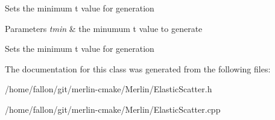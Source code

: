 Sets the minimum t value for generation 
\begin{DoxyParams}{Parameters}
{\em tmin} & the minumum t value to generate\\
\hline
\end{DoxyParams}
Sets the minimum t value for generation 

The documentation for this class was generated from the following files\+:\begin{DoxyCompactItemize}
\item 
/home/fallon/git/merlin-\/cmake/\+Merlin/Elastic\+Scatter.\+h\item 
/home/fallon/git/merlin-\/cmake/\+Merlin/Elastic\+Scatter.\+cpp\end{DoxyCompactItemize}
